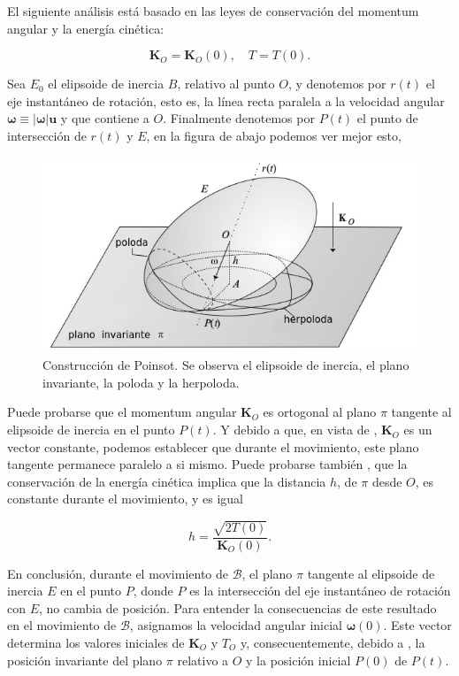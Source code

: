 \documentclass[a4paper,10pt]{article}
\numberwithin{equation}{section}
\begin{document}
El siguiente análisis está basado en las leyes de conservación del momentum angular 
y la energía cinética:

\begin{equation}
 \mathbf{K}_O = \mathbf{K}_O(0), \quad T = T(0).
 \label{eq:poinsot15}
\end{equation}

Sea $E_0$ el elipsoide de inercia $B$, relativo al punto $O$, y denotemos por $r(t)$ el 
eje instantáneo de rotación, esto es, la línea recta paralela a la velocidad angular 
$\mathbf{\omega} \equiv |\mathbf{\omega}|\mathbf{u}$ y que contiene a $O$. Finalmente
denotemos por $P(t)$ el punto de intersección de $r(t)$ y $E$, en la figura de abajo
podemos ver mejor esto,

\begin{figure}[H]
\center
\includegraphics[scale=0.6]{problema5fig1}
\caption{Construcción de Poinsot. Se observa el elipsoide de inercia, el plano invariante,
la poloda y la herpoloda.}
\label{fig:problema5fig1}
\end{figure}

Puede probarse que el momentum angular $\mathbf{K}_O$ es ortogonal al plano $\pi$ tangente 
al elipsoide de inercia en el punto $P(t)$. Y debido a que, en vista de ,
$\mathbf{K}_O$ es un vector constante, podemos establecer que durante el movimiento, este 
plano tangente permanece paralelo a si mismo. Puede probarse también \cite{romano}, que 
la conservación de la energía cinética implica que la distancia $h$, de $\pi$ desde $O$, es 
constante durante el movimiento, y es igual 

\begin{equation}
 h = \frac{\sqrt{2T(0)}}{\mathbf{K}_O(0)}.
 \label{eq:poinsot16}
\end{equation}

En conclusión, durante el movimiento de $\mathcal{B}$, el plano $\pi$ tangente al elipsoide
de inercia $E$ en el punto $P$, donde $P$ es la intersección del eje instantáneo de rotación 
con $E$, no cambia de posición. Para entender la consecuencias de este resultado en el 
movimiento de $\mathcal{B}$, asignamos la velocidad angular inicial $\mathbf{\omega}(0)$.
Este vector determina los valores iniciales de $\mathbf{K}_O$ y $T_O$ y, consecuentemente, 
debido a , la posición invariante del plano $\pi$ relativo a $O$ y la 
posición inicial $P(0)$ de $P(t)$.
\end{document}

